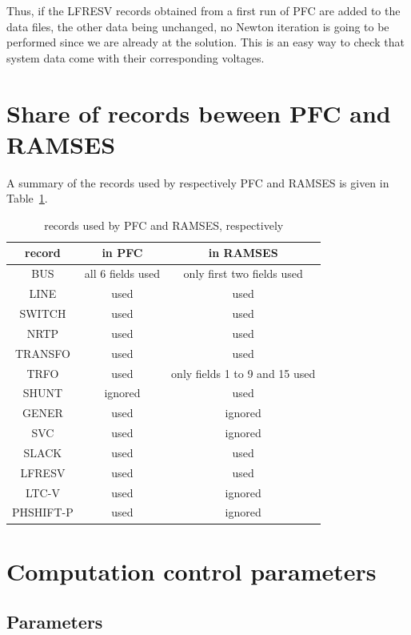 Thus, if the LFRESV records obtained from a first run of PFC are added to the data files, the other data being unchanged, no Newton iteration is going to be performed since we are already at the solution. This is an easy way to check that system data come with their corresponding voltages.


\section{Share of records beween PFC and RAMSES}

A summary of the records used by respectively PFC and RAMSES is given in Table~\ref{tab-records}.

\begin{table}[h!]
\centering
\caption{records used by PFC and RAMSES, respectively}\label{tab-records}
\begin{tabular}{|c|c|c|}
\hline
record & in PFC & in RAMSES \\ \hline \hline
BUS & all 6 fields used & only first two fields used \\ \hline
LINE & used & used \\ \hline
SWITCH & used & used \\ \hline
NRTP & used & used \\ \hline
TRANSFO & used & used \\ \hline
TRFO & used & only fields 1 to 9 and 15 used \\ \hline
SHUNT & ignored & used \\ \hline
GENER &  used & ignored \\ \hline
SVC & used & ignored \\ \hline
SLACK & used & used \\ \hline
LFRESV & used & used \\ \hline
LTC-V & used & ignored \\ \hline
PHSHIFT-P & used & ignored \\ \hline
\end{tabular}
\end{table}


\section{Computation control parameters}\label{sec-pfc-ctl}

\subsection{Parameters}

